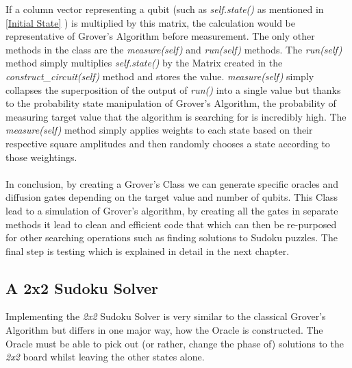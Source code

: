 \documentclass{article}
\begin{document}
 If a column vector representing a qubit (such as \textit{self.state()} as mentioned in \ref{Initial State} ) is multiplied by this matrix, the calculation would be representative of Grover's Algorithm before measurement. The only other methods in the class are the \textit{measure(self)} and \textit{run(self)} methods. The \textit{run(self)} method simply multiplies \textit{self.state()} by the Matrix created in the \textit{construct\_circuit(self)} method and stores the value. \textit{measure(self)} simply collapses the superposition of the output of \textit{run()} into a single value but thanks to the probability state manipulation of Grover's Algorithm, the probability of measuring target value that the algorithm is searching for is incredibly high. The \textit{measure(self)} method simply applies weights to each state based on their respective square amplitudes and then randomly chooses a state according to those weightings. 
 \\
 \\
 In conclusion, by creating a Grover's Class we can generate specific oracles and diffusion gates depending on the target value and number of qubits. This Class lead to a simulation of Grover's algorithm, by creating all the gates in separate methods it lead to clean and efficient code that which can then be re-purposed for other searching operations such as finding solutions to Sudoku puzzles. The final step is testing which is explained in detail in the next chapter.

\subsection{A 2x2 Sudoku Solver}

Implementing the \textit{2x2} Sudoku Solver is very similar to the classical Grover's Algorithm but differs in one major way, how the Oracle is constructed. The Oracle must be able to pick out (or rather, change the phase of) solutions to the \textit{2x2} board whilst leaving the other states alone.
\end{document}

